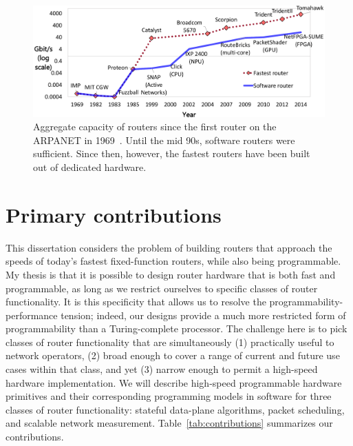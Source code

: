 \begin{figure}
\centering
\includegraphics[width=\columnwidth]{router_evolution.pdf}
\caption{Aggregate capacity of routers since the first router on the ARPANET in
1969~\cite{imp}. Until the mid 90s, software routers were sufficient. Since
then, however, the fastest routers have been built out of dedicated hardware.}
\label{fig:router_evolution}
\end{figure}

\section{Primary contributions}

This dissertation considers the problem of building routers that approach the
speeds of today's fastest fixed-function routers, while also being
programmable. My thesis is that it is possible to design router hardware that
is both fast and programmable, as long as we restrict ourselves to specific
classes of router functionality. It is this specificity that allows us to
resolve the programmability-performance tension; indeed, our designs provide a
much more restricted form of programmability than a Turing-complete processor.
The challenge here is to pick classes of router functionality that are
simultaneously (1) practically useful to network operators, (2) broad enough to
cover a range of current and future use cases within that class, and yet (3)
narrow enough to permit a high-speed hardware implementation. We will describe
high-speed programmable hardware primitives and their corresponding programming
models in software for three classes of router functionality: stateful
data-plane algorithms, packet scheduling, and scalable network measurement.
Table~\ref{tab:contributions} summarizes our contributions.

